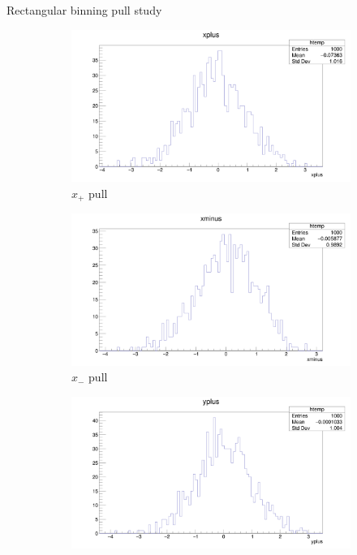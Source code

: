 \documentclass{beamer}
\begin{document}
\begin{frame}{Rectangular binning pull study}
  \begin{figure}
    \centering
    \vspace{-0.2cm}
    \begin{subfigure}{0.5\textwidth}
      \includegraphics[width = 1.0\textwidth]{SophisticatedPulls/xplus1K1K.png}
      \caption{$x_+$ pull}
    \end{subfigure}%
    \begin{subfigure}{0.5\textwidth}
      \includegraphics[width = 1.0\textwidth]{SophisticatedPulls/xminus1K1K.png}
      \caption{$x_-$ pull}
    \end{subfigure}
    \begin{subfigure}{0.5\textwidth}
      \includegraphics[width = 1.0\textwidth]{SophisticatedPulls/yplus1K1K.png}

\end{subfigure}
\end{figure}
\end{frame}
\end{document}
